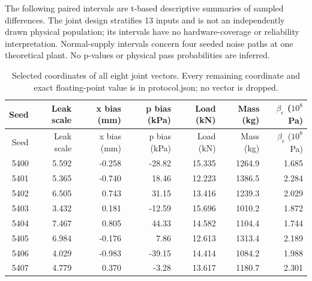The following paired intervals are t-based descriptive summaries of sampled differences. The joint design stratifies 13 inputs and is not an independently drawn physical population; its intervals have no hardware-coverage or reliability interpretation. Normal-supply intervals concern four seeded noise paths at one theoretical plant. No p-values or physical pass probabilities are inferred.

\begingroup\hypersetup{hypertexnames=true}\small\setlength{\tabcolsep}{4pt}
\begin{longtable}{rrrrrrr}
\caption{Selected coordinates of all eight joint vectors. Every remaining coordinate and exact floating-point value is in protocol.json; no vector is dropped.}\\\toprule
Seed & Leak scale & x bias (mm) & p bias (kPa) & Load (kN) & Mass (kg) & $\beta_e$ ($10^8$ Pa)\\\midrule\endfirsthead
\toprule
Seed & Leak scale & x bias (mm) & p bias (kPa) & Load (kN) & Mass (kg) & $\beta_e$ ($10^8$ Pa)\\\midrule\endhead
5400 & 5.592 & -0.258 & -28.82 & 15.335 & 1264.9 & 1.685\\
5401 & 5.365 & -0.740 & 18.46 & 12.223 & 1386.5 & 2.284\\
5402 & 6.505 & 0.743 & 31.15 & 13.416 & 1239.3 & 2.029\\
5403 & 3.432 & 0.181 & -12.59 & 15.696 & 1010.2 & 1.872\\
5404 & 7.467 & 0.805 & 44.33 & 14.582 & 1104.4 & 1.744\\
5405 & 6.984 & -0.176 & 7.86 & 12.613 & 1313.4 & 2.189\\
5406 & 4.029 & -0.983 & -39.15 & 14.414 & 1084.2 & 1.988\\
5407 & 4.779 & 0.370 & -3.28 & 13.617 & 1180.7 & 2.301\\
\bottomrule\end{longtable}\endgroup

